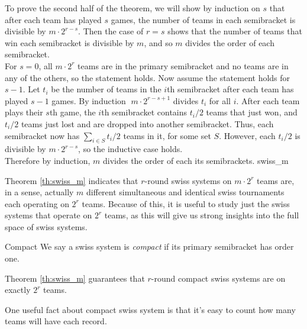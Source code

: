 {{        To prove the second half of the theorem, we will show by induction on $s$ that after each team has played $s$ games, the number of teams in each semibracket is divisible by $m \cdot 2^{r - s}.$ Then the case of $r = s$ shows that the number of teams that win each semibracket is divisible by $m$, and so $m$ divides the order of each semibracket.\\

        For $s = 0$, all $m \cdot 2^r$ teams are in the primary semibracket and no teams are in any of the others, so the statement holds. Now assume the statement holds for $s - 1$. Let $t_i$ be the number of teams in the $i$th semibracket after each team has played $s -1$ games. By induction $\; m \cdot 2^{r - s + 1}$ divides $t_i$ for all $i$. After each team plays their $s$th game, the $i$th semibracket contains $t_i/2$ teams that just won, and $t_i/2$ teams just lost and are dropped into another semibracket. Thus, each semibracket now has $\sum_{i \in S} t_i / 2$ teams in it, for some set $S.$ However, each $t_i / 2$ is divisible by $m \cdot 2^{r - s}$, so the inductive case holds.\\
        
        Therefore by induction, $m$ divides the order of each its semibrackets.
    }{swiss_m}

    Theorem \ref{th:swiss_m} indicates that $r$-round swiss systems on $m \cdot 2^r$ teams are, in a sense, actually $m$ different simultaneous and identical swiss tournaments each operating on $2^r$ teams. Because of this, it is useful to study just the swiss systems that operate on $2^r$ teams, as this will give us strong insights into the full space of swiss systems.

    \begin{definition}{Compact}{}
        We say a swiss system is \textit{compact} if its primary semibracket has order one.
    \end{definition}

    Theorem \ref{th:swiss_m} guarantees that $r$-round compact swiss systems are on exactly $2^r$ teams.

    One useful fact about compact swiss system is that it's easy to count how many teams will have each record.

    }
